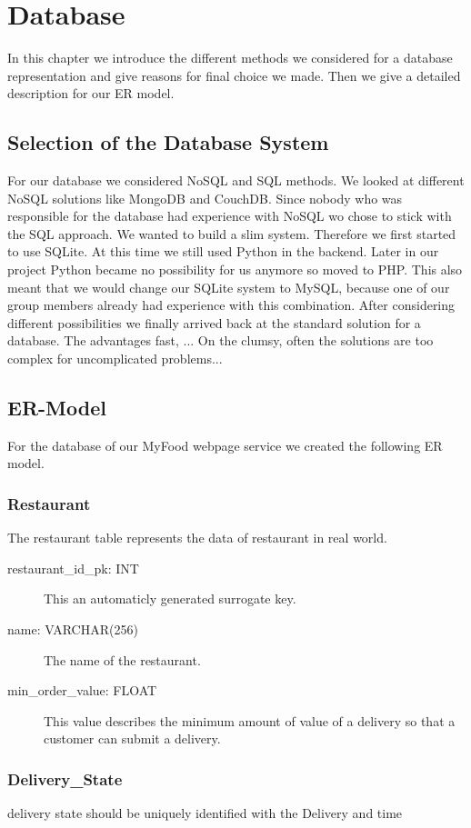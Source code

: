 \chapter{Database}

In this chapter we introduce the different methods we considered for a database representation and give reasons for final choice we made. Then we give a detailed description for our ER model.

\section{Selection of the Database System}
For our database we considered NoSQL and SQL methods. We looked at different NoSQL solutions like MongoDB and CouchDB.
Since nobody who was responsible for the database had experience with NoSQL wo chose to stick with the SQL approach. We  wanted to build a slim system. Therefore we first started to use SQLite. At this time we still used Python in the backend. Later in our project Python became no possibility for us anymore so moved to PHP. This also meant that we would change our SQLite system to MySQL, because one of our group members already had experience with this combination. After considering different possibilities we finally arrived back at the standard solution for a database. The advantages fast, ... %
On the clumsy, often the solutions are too complex for uncomplicated problems...%


\section{ER-Model}
	For the database of our MyFood webpage service we created the following ER model.

	\subsection{Restaurant}
	The restaurant table represents the data of restaurant in real world.

	\begin{description}
		\item[restaurant\_id\_pk: INT] This an automaticly generated surrogate key.
		\item[name: VARCHAR(256)] The name of the restaurant.
		\item[min\_order\_value: FLOAT] This value describes the minimum amount of value of a delivery so that a customer can submit a delivery.
	\end{description}

	\subsection{Delivery\_State}
	delivery state should be uniquely identified with the Delivery and time

